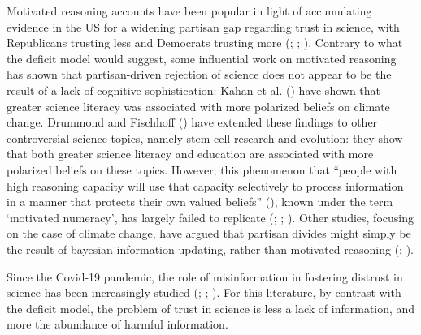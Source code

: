 \documentclass[
  jou,
  floatsintext,
  longtable,
  nolmodern,
  notxfonts,
  notimes,
  colorlinks=true,linkcolor=blue,citecolor=blue,urlcolor=blue]{apa7}
\begin{document}
Motivated reasoning accounts have been popular in light of accumulating
evidence in the US for a widening partisan gap regarding trust in
science, with Republicans trusting less and Democrats trusting more
(;
;
). Contrary to
what the deficit model would suggest, some influential work on motivated
reasoning has shown that partisan-driven rejection of science does not
appear to be the result of a lack of cognitive sophistication: Kahan et
al. () have shown
that greater science literacy was associated with more polarized beliefs
on climate change. Drummond and Fischhoff
() have
extended these findings to other controversial science topics, namely
stem cell research and evolution: they show that both greater science
literacy and education are associated with more polarized beliefs on
these topics. However, this phenomenon that ``people with high reasoning
capacity will use that capacity selectively to process information in a
manner that protects their own valued beliefs''
(), known under the term `motivated numeracy', has
largely failed to replicate
(;
; ). Other studies, focusing on the case of climate change,
have argued that partisan divides might simply be the result of bayesian
information updating, rather than motivated reasoning
(; ).

Since the Covid-19 pandemic, the role of misinformation in fostering
distrust in science has been increasingly studied
(;
;
). For this literature, by contrast with the deficit model,
the problem of trust in science is less a lack of information, and more
the abundance of harmful information.
\end{document}
